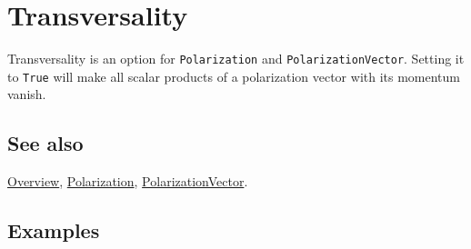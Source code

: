 \documentclass[../FeynCalcManual.tex]{subfiles}
\begin{document}
\hypertarget{transversality}{%
\section{Transversality}\label{transversality}}

Transversality is an option for \texttt{Polarization} and
\texttt{PolarizationVector}. Setting it to \texttt{True} will make all
scalar products of a polarization vector with its momentum vanish.

\subsection{See also}

\hyperlink{toc}{Overview}, \hyperlink{polarization}{Polarization},
\hyperlink{polarizationvector}{PolarizationVector}.

\subsection{Examples}
\end{document}
